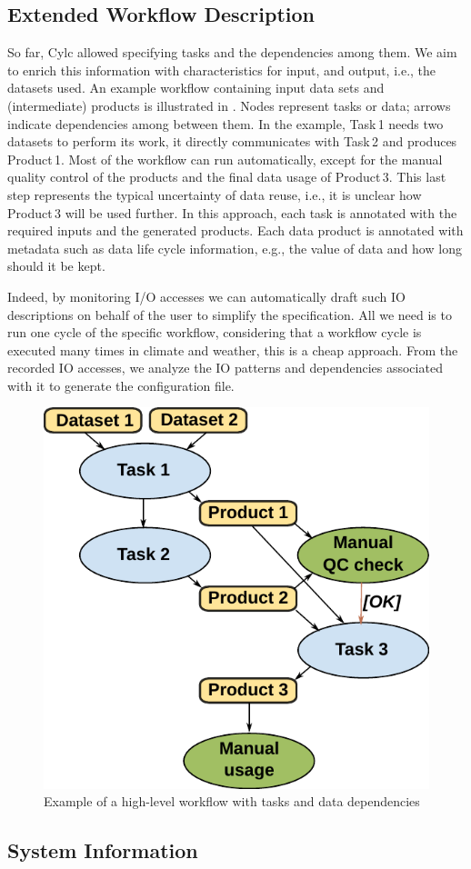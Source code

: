 \documentclass[a4paper]{article}
\begin{document}
\subsection{Extended Workflow Description}

So far, Cylc allowed specifying tasks and the dependencies among them.
We aim to enrich this information with characteristics for input, and output, i.e., the datasets used.
An example workflow containing input data sets and (intermediate) products is illustrated in .
Nodes represent tasks or data; arrows indicate dependencies among between them.
In the example, Task\,1 needs two datasets to perform its work, it directly communicates with Task\,2 and produces Product\,1.
Most of the workflow can run automatically, except for the manual quality control of the products and the final data usage of Product\,3.
This last step represents the typical uncertainty of data reuse, i.e., it is unclear how Product\,3 will be used further.
In this approach, each task is annotated with the required inputs and the generated products.
Each data product is annotated with metadata such as data life cycle information, e.g., the value of data and how long should it be kept.

Indeed, by monitoring I/O accesses we can automatically draft such IO descriptions on behalf of the user to simplify the specification.
All we need is to run one cycle of the specific workflow, considering that a workflow cycle is executed many times in climate and weather, this is a cheap approach.
From the recorded IO accesses, we analyze the IO patterns and dependencies associated with it to generate the configuration file.

\begin{figure}[H]
  \centering
  \includegraphics[width=0.4\columnwidth]{workflow}
  \caption{Example of a high-level workflow with tasks and data dependencies}
  \label{fig:workflow}
\end{figure}

\subsection{System Information}
\end{document}
